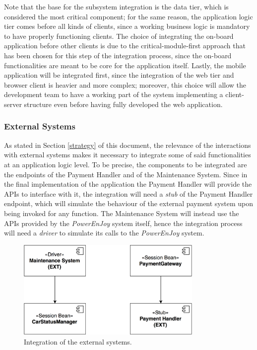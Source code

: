 Note that the base for the subsystem integration is the data tier, which is considered the most critical component; for the same reason, the application logic tier comes before all kinds of clients, since a working business logic is mandatory to have properly functioning clients. The choice of integrating the on-board application before other clients is due to the critical-module-first approach that has been chosen for this step of the integration process, since the on-board functionalities are meant to be core for the application itself. Lastly, the mobile application will be integrated first, since the integration of the web tier and browser client is heavier and more complex; moreover, this choice will allow the development team to have a working part of the system implementing a client-server structure even before having fully developed the web application.

\subsubsection{External Systems}
As stated in Section \ref{strategy} of this document, the relevance of the interactions with external systems makes it necessary to integrate some of said functionalities at an application logic level.
\noindent
To be precise, the components to be integrated are the endpoints of the Payment Handler and of the Maintenance System. Since in the final implementation of the application the Payment Handler will provide the APIs to interface with it, the integration will need a \emph{stub} of the Payment Handler endpoint, which will simulate the behaviour of the external payment system upon being invoked for any function. The Maintenance System will instead use the APIs provided by the \textit{PowerEnJoy} system itself, hence the integration process will need a \emph{driver} to simulate its calls to the \textit{PowerEnJoy} system.

\begin{figure}[H]
\begin{center}
		\includegraphics[width=0.8\textwidth]{./integration_strategy/diagrams/external_systems.png}
		\caption{Integration of the external systems.}
\end{center}
\end{figure}